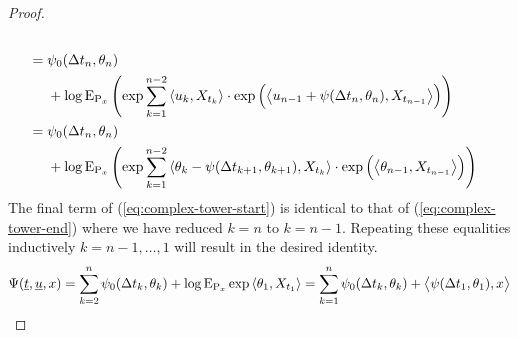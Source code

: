\begin{proof}
\begin{align}
\begin{aligned}[t]
    \end{aligned} \\
    \notag
    &= \begin{aligned}[t]
      &\psi_0(\Delta t_n, \theta_n) \\
      &+ \log{\operatorname{E}}_{{\operatorname{P}}_x}\left( \exp\sum_{k=1}^{n-2} {\langle u_k , X_{t_k} \rangle} \cdot \exp\Big( {\big\langle u_{n-1} + \psi(\Delta t_n, \theta_n) , X_{t_{n-1}} \big\rangle} \Big)   \right) 
    \end{aligned} \\
    \label{eq:complex-tower-end}
    &= \begin{aligned}[t]
      &\psi_0(\Delta t_n, \theta_n) \\
      &+ \log{\operatorname{E}}_{{\operatorname{P}}_x}\left( \exp\sum_{k=1}^{n-2} {\langle \theta_k - \psi(\Delta t_{k+1}, \theta_{k+1}) , X_{t_k} \rangle} \cdot \exp\Big( {\big\langle \theta_{n-1} , X_{t_{n-1}} \big\rangle} \Big)   \right) 
    \end{aligned}
  \end{align}
  The final term of (\ref{eq:complex-tower-start}) is identical to that of (\ref{eq:complex-tower-end}) where we have reduced $k = n$ to $k = n-1$.
  Repeating these equalities inductively $k = n -1, \ldots, 1$ will result in the desired identity.
  \begin{equation*}
    \Psi(\underline t, \underline{u}, x) 
    = \sum_{k=2}^n \psi_0(\Delta t_k, \theta_k) + \log{\operatorname{E}}_{{\operatorname{P}}_x}\exp{\langle \theta_1 , X_{t_1} \rangle} 
    = \sum_{k=1}^n \psi_0(\Delta t_k, \theta_k) + {\big\langle \psi(\Delta t_1, \theta_1) , x \big\rangle}
  \end{equation*}
\end{proof}
